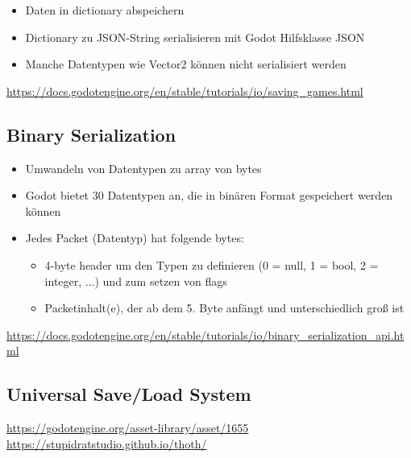 \begin{itemize}
    \item Daten in dictionary abspeichern
    \item Dictionary zu JSON-String serialisieren mit Godot Hilfsklasse JSON
    \item Manche Datentypen wie Vector2 können nicht serialisiert werden
\end{itemize}

\url{https://docs.godotengine.org/en/stable/tutorials/io/saving_games.html}\\

\subsection{Binary Serialization}

\begin{itemize}
    \item Umwandeln von Datentypen zu array von bytes
    \item Godot bietet 30 Datentypen an, die in binären Format gespeichert werden können
    \item Jedes Packet (Datentyp) hat folgende bytes:
    \begin{itemize}
        \item 4-byte header um den Typen zu definieren (0 = null, 1 = bool, 2 = integer, ...) und zum setzen von flags
        \item Packetinhalt(e), der ab dem 5. Byte anfängt und unterschiedlich groß ist 
    \end{itemize}
\end{itemize}

\url{https://docs.godotengine.org/en/stable/tutorials/io/binary_serialization_api.html}

\subsection{Universal Save/Load System}
\url{https://godotengine.org/asset-library/asset/1655}\\
\url{https://stupidratstudio.github.io/thoth/}